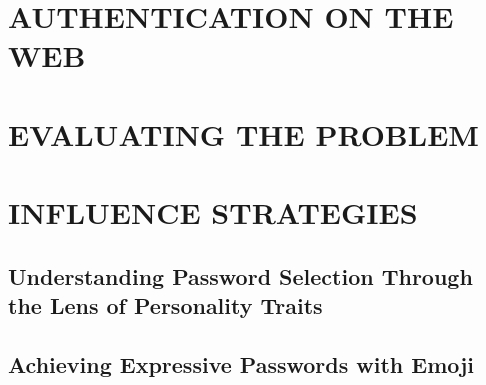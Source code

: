\documentclass[12pt,a4paper]{book}
\begin{document}
\frontmatter
\maketitle
\tableofcontents

\mainmatter


\part{AUTHENTICATION ON THE WEB}


%
%





%

%


\part{EVALUATING THE PROBLEM}






\part{INFLUENCE STRATEGIES}

\chapter{Understanding Password Selection Through the Lens of Personality Traits}
\chapter{Achieving Expressive Passwords with Emoji}


\end{document}
